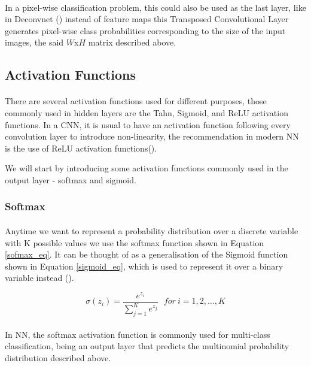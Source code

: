 \paragraph{}
In a pixel-wise classification problem, this could also be used as the last layer, like in Deconvnet (\cite{7410535}) instead of feature maps this Transposed Convolutional Layer generates pixel-wise class probabilities corresponding to the size of the input images, the said $W$x$H$ matrix described above.

\subsection{Activation Functions} \label{cnn_activation}
\paragraph{}
There are several activation functions used for different purposes, those commonly used in hidden layers are the Tahn, Sigmoid, and \gls{ReLU} activation functions.
In a \gls{CNN}, it is usual to have an activation function following every convolution layer to introduce non-linearity, the recommendation in modern \gls{NN} is the use of \gls{ReLU} activation functions(\cite{GoodBengCour16}).

We will start by introducing some activation functions commonly used in the output layer - softmax and sigmoid.

\subsubsection{Softmax}
\paragraph{}
Anytime we want to represent a probability distribution over a discrete variable with K possible values we use the softmax function shown in Equation \ref{sofmax_eq}. It can be thought of as a generalisation of the Sigmoid function shown in Equation \ref{sigmoid_eq}, which is used to represent it over a binary variable instead (\cite{GoodBengCour16}).

\begin{equation}
    \label{sofmax_eq}
    \sigma(z_i) = \frac{e^{z_{i}}}{\sum_{j=1}^K e^{z_{j}}} \ \ \ for\ i=1,2,\dots,K
\end{equation}

\paragraph{}
In \gls{NN}, the softmax activation function is commonly used for multi-class classification, being an output layer that predicts the multinomial probability distribution described above.

